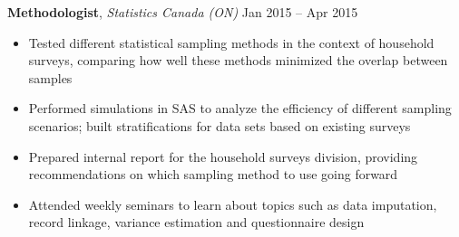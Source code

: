 \documentclass[11pt]{article}
\begin{document}
\pagebreak
\begin{addmargin}[2.75em]{0em}
\textbf{Methodologist}, \textit{Statistics Canada (ON)} \hfill Jan 2015 -- Apr 2015
\end{addmargin}
%
\vspace{1mm}
\begin{addmargin}[1.75em]{0em}
\begin{itemize}
\setlength\itemsep{-0.4em}
\item Tested different statistical sampling methods in the context of household surveys, comparing how well these methods minimized the overlap between samples
\item Performed simulations in SAS to analyze the efficiency of different sampling scenarios; built stratifications for data sets based on existing surveys
\item Prepared internal report for the household surveys division, providing recommendations on which sampling method to use going forward
\item Attended weekly seminars to learn about topics such as data imputation, record linkage, variance estimation and questionnaire design
\end{itemize}
\end{addmargin}
\end{document}

